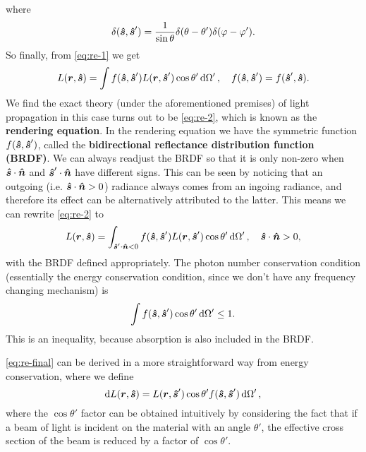 \documentclass[hyperref, a4paper]{article}
\newcommand*{\concept}[1]{{\textbf{#1}}}
\begin{document}
where 
\begin{equation}
    \delta(\vu*{s}, \vu*{s}') = \frac{1}{\sin \theta} \delta(\theta - \theta') \delta(\varphi - \varphi'). 
\end{equation}
So finally, from \eqref{eq:re-1} we get 
\begin{equation}
    L(\vb*{r}, \vu*{s}) = \int f(\vu*{s}, \vu*{s}') L(\vb*{r}, \vu*{s}') \cos \theta' \dd{\Omega'}, 
    \quad f(\vu*{s}, \vu*{s}') = f(\vu*{s}', \vu*{s}).
    \label{eq:re-2}
\end{equation}
We find the exact theory (under the aforementioned premises) of light propagation 
in this case turns out to be \eqref{eq:re-2},
which is known as the \concept{rendering equation}. 
In the rendering equation we have the symmetric function $f(\vu*{s}, \vu*{s}')$,
called the \concept{bidirectional reflectance distribution function (BRDF)}. 
We can always readjust the BRDF so that it is only non-zero 
when $\vu*{s} \cdot \vu*{n}$ and $\vu*{s}' \cdot \vu*{n}$
have different signs. 
This can be seen by noticing that an outgoing (i.e. $\vu*{s} \cdot \vu*{n} > 0$) radiance 
always comes from an ingoing radiance, 
and therefore its effect can be alternatively attributed to the latter. 
This means we can rewrite \eqref{eq:re-2} to
\begin{equation}
    L(\vb*{r}, \vu*{s}) = \int_{\vu*{s}' \cdot \vu*{n} < 0} 
    f(\vu*{s}, \vu*{s}') L(\vb*{r}, \vu*{s}') \cos \theta' \dd{\Omega'}, \quad 
    \vu*{s} \cdot \vu*{n} > 0,
    \label{eq:re-final}
\end{equation}
with the BRDF defined appropriately.
The photon number conservation condition (essentially the energy conservation condition, 
since we don't have any frequency changing mechanism) is 
\begin{equation}
    \int f(\vu*{s}, \vu*{s}') \cos \theta' \dd{\Omega'}  \leq 1.
\end{equation}
This is an inequality, because absorption is also included in the BRDF.

\eqref{eq:re-final} can be derived in a more straightforward way 
from energy conservation, 
where we define 
\begin{equation}
    \dd{L(\vb*{r}, \vu*{s})} = L(\vb*{r}, \vu*{s}') \cos \theta' f(\vu*{s}, \vu*{s}') \dd{\Omega'},
\end{equation}
where the $\cos \theta'$ factor can be obtained intuitively 
by considering the fact that if a beam of light 
is incident on the material with an angle $\theta'$, 
the effective cross section of the beam is reduced by a factor of $\cos \theta'$.
\end{document}
